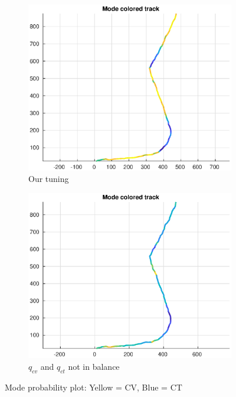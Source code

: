 \begin{figure}
    \centering
    \hspace{-3cm}\begin{adjustbox}{minipage=\linewidth, scale=1.3}
        \begin{subfigure}{.5\textwidth}
            \includegraphics[width=\linewidth]{plots/task22_modeprob.eps} 
            \caption{Our tuning}
            \label{fig:task22_modeprob_tuned}
        \end{subfigure}
        \begin{subfigure}{.5\textwidth}
            \includegraphics[width=\linewidth]{plots/task22_modeprob_highcv.eps} 
            \caption{$q_{cv}$ and $q_{ct}$ not in balance}
            \label{fig:task22_modeprob_highcv}
        \end{subfigure}
    \end{adjustbox}
        \caption{Mode probability plot: Yellow = CV, Blue = CT}
        \label{fig:task22_modeprob}
\end{figure}
